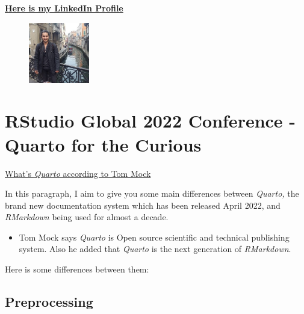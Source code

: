 \documentclass[
  letterpaper,
  DIV=11,
  numbers=noendperiod]{scrreprt}
\providecommand{\tightlist}{%
  \setlength{\itemsep}{0pt}\setlength{\parskip}{0pt}}\usepackage{longtable,booktabs,array}
\begin{document}
\href{https://www.linkedin.com/in/emre-\%C3\%A7akmak-7778b160/}{\textbf{Here
is my LinkedIn Profile}}

\begin{figure}

\href{https://www.linkedin.com/in/emre-\%C3\%A7akmak-7778b160/}{\includegraphics[width=1.04167in,height=\textheight]{./images/emrecakmak.png}}

\end{figure}

\hypertarget{rstudio-global-2022-conference---quarto-for-the-curious}{%
\section{RStudio Global 2022 Conference - Quarto for the
Curious}\label{rstudio-global-2022-conference---quarto-for-the-curious}}

\href{https://www.rstudio.com/conference/2022/talks/quarto-for-rmarkdown-users/}{What's
\emph{Quarto} according to Tom Mock}

In this paragraph, I aim to give you some main differences between
\emph{Quarto,} the brand new documentation system which has been
released April 2022, and \emph{RMarkdown} being used for almost a
decade.

\begin{itemize}
\tightlist
\item
  Tom Mock says \emph{Quarto} is Open source scientific and technical
  publishing system. Also he added that \emph{Quarto} is the next
  generation of \emph{RMarkdown}.
\end{itemize}

Here is some differences between them:

\hypertarget{preprocessing}{%
\subsection{Preprocessing}\label{preprocessing}}
\end{document}
